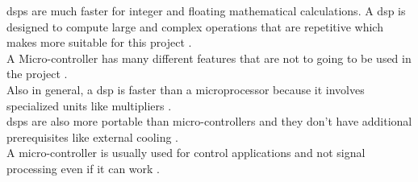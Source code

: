 \gls{dsp}s are much faster for integer and floating mathematical calculations. A \gls{dsp} is designed to compute large and complex operations that are repetitive which makes more suitable for this project \citep{diffbet} \citep{esp_simone}.   \\

A Micro-controller has many different features that are not to going to be used in the project \citep{diffbet} \citep{esp_simone}. \\

Also in general, a \gls{dsp} is faster than a microprocessor because it involves specialized units like multipliers \citep{diffbet2}. \\

\gls{dsp}s are also more portable than micro-controllers and they don’t have additional prerequisites like external cooling \citep{diffbet2}. \\

A micro-controller is usually used for control applications and not signal processing even if it can work \citep{tex_dsp}.\\ 











